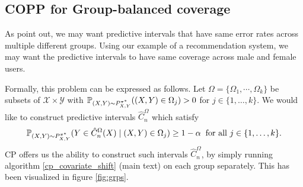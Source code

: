 








\subsection{COPP for Group-balanced coverage}\label{sec:grp-bal}
As \cite{conf-bates} point out, we may want predictive intervals that have same error rates across multiple different groups. Using our example of a recommendation system, we may want the predictive intervals to have same coverage across male and female users. 

Formally, this problem can be expressed as follows. Let $\Omega = \{\Omega_1, \cdots, \Omega_k \}$ be subsets of $\mathcal{X} \times \mathcal{Y}$ with $\mathbb{P}_{(X,Y)\sim P^{\pi^*}_{X,Y}}((X,Y) \in \Omega_j) > 0$ for $j\in \{1, \dots, k\}$. We would like to construct  predictive intervals $\hat{C}_n^\Omega$ which satisfy 
\begin{align}
    \mathbb{P}_{(X,Y)\sim P^{\pi^*}_{X,Y}}(Y \in \hat{C}_n^\Omega(X) \mid (X, Y) \in  \Omega_j) \geq 1-\alpha \hspace{0.2cm} \textup{for all $j\in \{1, \dots, k\}$.} \nonumber
\end{align}
CP offers us the ability to construct such intervals $\hat{C}_n^\Omega$, by simply running algorithm \ref{cp_covariate_shift} (main text) on each group separately. This has been visualized in figure \ref{fig:grps}. 

